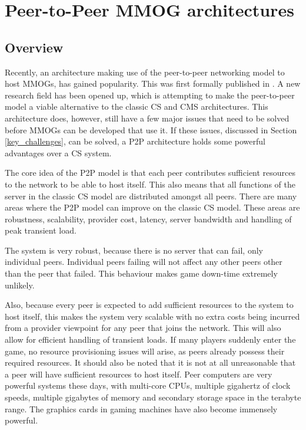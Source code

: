 \documentclass[journal,oneside,a4paper,onecolumn]{IEEEtran}
\begin{document}
\section{Peer-to-Peer MMOG architectures}
\subsection{Overview}

Recently, an architecture making use of the peer-to-peer networking model to host MMOGs, has gained popularity. This was first formally published in \cite{knutsson_p2p_first}. A new research field has been opened up, which is attempting to make the peer-to-peer model a viable alternative to the classic \ac{CS} and \ac{CMS} architectures. This architecture does, however, still have a few major issues that need to be solved before MMOGs can be developed that use it. If these issues, discussed in Section \ref{key_challenges}, can be solved, a \ac{P2P} architecture holds some powerful advantages over a \ac{CS} system.

The core idea of the \ac{P2P} model is that each peer contributes sufficient resources to the network to be able to host itself. This also means that all functions of the server in the classic \ac{CS} model are distributed amongst all peers. There are many areas where the \ac{P2P} model can improve on the classic \ac{CS} model. These areas are robustness, scalability, provider cost, latency, server bandwidth and handling of peak transient load.

The system is very robust, because there is no server that can fail, only individual peers. Individual peers failing will not affect any other peers other than the peer that failed. This behaviour makes game down-time extremely unlikely.

Also, because every peer is expected to add sufficient resources to the system to host itself, this makes the system very scalable with no extra costs being incurred from a provider viewpoint for any peer that joins the network. This will also allow for efficient handling of transient loads. If many players suddenly enter the game, no resource provisioning issues will arise, as peers already possess their required resources. It should also be noted that it is not at all unreasonable that a peer will have sufficient resources to host itself. Peer computers are very powerful systems these days, with multi-core CPUs, multiple gigahertz of clock speeds, multiple gigabytes of memory and secondary storage space in the terabyte range. The graphics cards in gaming machines have also become immensely powerful.
\end{document}
